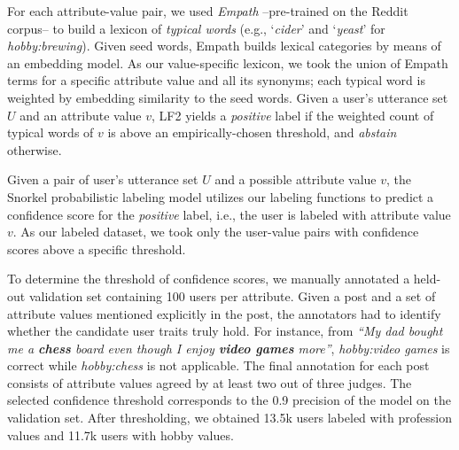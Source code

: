 \begin{table}[t!]
\caption[Positive and negative patterns used in Snorkel labeling model.]{Positive and negative patterns used in the labeling function LF1 of the Snorkel labeling model. Each pattern must be followed by possible attribute values within a context window of 2 terms.}
\label{tab:patterns}
\end{table}


 For each attribute-value pair, we used \textit{Empath} \cite{fast2016empath} --pre-trained on the Reddit corpus-- to build a lexicon of \emph{typical words} (e.g., `\textit{cider}' and `\textit{yeast}' for \emph{hobby:brewing}). Given seed words, Empath builds lexical categories by means of an embedding model. As our value-specific lexicon, we took the union of Empath terms for a specific attribute value and all its synonyms; each typical word is weighted by embedding similarity to the seed words. 
Given a user's utterance set $U$ and an attribute value $v$, LF2 yields a \emph{positive} label if the weighted count of typical words of $v$ is above an empirically-chosen threshold, and \emph{abstain} otherwise.

\vspace{5pt}
Given a pair of user's utterance set $U$ and a possible attribute value $v$, the Snorkel probabilistic labeling model utilizes our labeling functions to
predict a confidence score for the \emph{positive} label, i.e., the user is labeled with attribute value $v$.
As our labeled dataset, we took only the user-value pairs with confidence scores above a specific threshold. 

To determine the threshold of confidence scores, we manually annotated a held-out validation set containing 100 users per attribute. 
Given a post and a set of attribute values mentioned explicitly in the post, the annotators had to identify whether the candidate user traits truly hold. For instance, from \emph{``My dad bought me a \textbf{chess} board even though I enjoy \textbf{video games} more''}, \emph{hobby:video games} is correct while \emph{hobby:chess} is not applicable.
The final annotation for each post consists of attribute values agreed by at least two out of three judges. The selected confidence threshold corresponds to the 0.9 precision of the model on the validation set. After thresholding, we obtained 13.5k users labeled with profession values and 11.7k users with hobby values.

